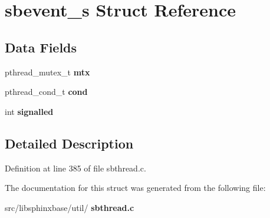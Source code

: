 \section{sbevent\+\_\+s Struct Reference}
\label{structsbevent__s}
\subsection*{Data Fields}
\begin{DoxyCompactItemize}
\item 
\mbox{\label{structsbevent__s_a2c6c3b97c5c6bbdba1e97cc94c7441fa}} 
pthread\+\_\+mutex\+\_\+t {\bfseries mtx}
\item 
\mbox{\label{structsbevent__s_a19bacf6b25bc5e66c8691063c7bd305e}} 
pthread\+\_\+cond\+\_\+t {\bfseries cond}
\item 
\mbox{\label{structsbevent__s_a04d5cd777873bd83b337aacb6246281a}} 
int {\bfseries signalled}
\end{DoxyCompactItemize}


\subsection{Detailed Description}


Definition at line 385 of file sbthread.\+c.



The documentation for this struct was generated from the following file\+:\begin{DoxyCompactItemize}
\item 
src/libsphinxbase/util/\textbf{ sbthread.\+c}\end{DoxyCompactItemize}
